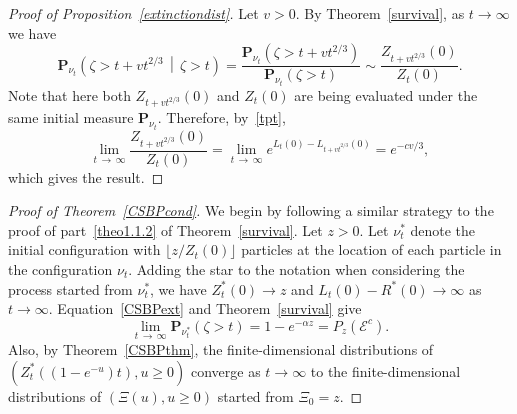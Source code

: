 \documentclass[10pt]{amsart}
\theoremstyle{definition}\newtheorem{defi}[theo]{Definition}\newtheorem{rema}[theo]{Remark}\newtheorem{exam}[theo]{Example}\newtheorem{exem}[theo]{Example}\newtheorem{nota}[theo]{Notation}
\renewcommand*\P{\mathbf{P}}
\newcommand{\clE}{\mathcal{E}}
\newcommand{\1} {\mathds{1}}
\begin{document}
\begin{proof}[Proof of Proposition~\ref{extinctiondist}]
Let $v > 0$. By Theorem~\ref{survival}, as $t \rightarrow \infty$ we have
\[
\P_{\nu_t}\left(\zeta > t + v t^{2/3}\,\middle|\,\zeta > t\right) = \frac{\P_{\nu_t}\left(\zeta > t + v t^{2/3}\right)}{\P_{\nu_t}(\zeta > t)} \sim \frac{Z_{t + vt^{2/3}}(0)}{Z_t(0)}.
\]
Note that here both $Z_{t+vt^{2/3}}(0)$ and $Z_t(0)$ are being evaluated under the same initial measure $\P_{\nu_t}$. Therefore, by~\eqref{tpt},
\[
\lim_{t\,\rightarrow\,\infty} \frac{Z_{t + vt^{2/3}}(0)}{Z_t(0)} = \lim_{t\,\rightarrow\,\infty} e^{L_t(0) - L_{t + vt^{2/3}}(0)} = e^{-cv/3},
\]
which gives the result.
\end{proof}

\begin{proof}[Proof of Theorem~\ref{CSBPcond}]
We begin by following a similar strategy to the proof of part~\eqref{theo1.1.2} of Theorem~\ref{survival}. Let $z > 0$. Let $\nu_t^*$ denote the initial configuration with $\lfloor z/Z_t(0) \rfloor$ particles at the location of each particle in the configuration $\nu_t$. Adding the star to the notation when considering the process started from $\nu_t^*$, we have $Z_t^*(0) \rightarrow z$ and $L_t(0) - R^*(0) \rightarrow \infty$ as $t \rightarrow \infty$. Equation~\eqref{CSBPext} and Theorem~\ref{survival} give
\begin{equation}\label{starprob}
\lim_{t\,\rightarrow\,\infty} \P_{\nu^*_t}(\zeta > t) = 1 - e^{-\alpha z} = P_z\left(\clE^c\right).
\end{equation}
Also, by Theorem~\ref{CSBPthm}, the finite-dimensional distributions of $(Z_t^*((1 - e^{-u})t), u \geq 0)$ converge as $t \rightarrow \infty$ to the finite-dimensional distributions of $(\Xi(u), u \geq 0)$ started from $\Xi_0 = z$.


\end{proof}
\end{document}
